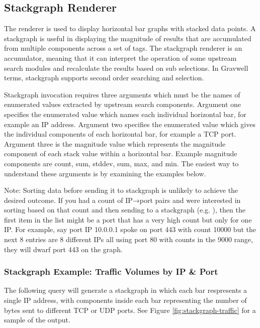 \clearpage

\subsection{Stackgraph Renderer}
The  renderer is used to display horizontal bar graphs
with stacked data points. A stackgraph is useful in displaying the
magnitude of results that are accumulated from multiple components
across a set of tags. The stackgraph renderer is an accumulator,
meaning that it can interpret the operation of some upstream search
modules and recalculate the results based on sub selections. In Gravwell
terms, stackgraph supports second order searching and selection.

Stackgraph invocation requires three arguments which must be the names
of enumerated values extracted by upstream search components. Argument
one specifies the enumerated value which names each individual
horizontal bar, for example an IP address. Argument two specifies the
enumerated value which gives the individual components of each
horizontal bar, for example a TCP port. Argument three is the magnitude
value which represents the magnitude component of each stack value
within a horizontal bar. Example magnitude components are count, sum,
stddev, sum, max, and min. The easiest way to understand these arguments
is by examining the examples below.

Note: Sorting data before sending it to stackgraph is unlikely to
achieve the desired outcome. If you had a count of IP→port pairs
and were interested in sorting based on that count and then sending to a
stackgraph (e.g. ), then the first item in the
list might be a port that has a very high count but only for one IP. For
example, say port IP 10.0.0.1 spoke on port 443 with count 10000 but the
next 8 entries are 8 different IPs all using port 80 with counts in the
9000 range, they will dwarf port 443 on the graph.

\subsubsection{Stackgraph Example: Traffic Volumes by IP \& Port}

The following query will generate a stackgraph in which each bar respresents
a single IP address, with components inside each bar representing the number
of bytes sent to different TCP or UDP ports. See Figure \ref{fig:stackgraph-traffic}
for a sample of the output.

